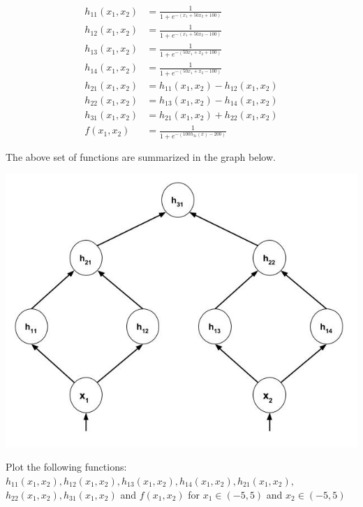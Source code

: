 \documentclass[solution,addpoints,12pt]{exam}
\begin{document}
\begin{questions}
\begin{parts}
                  \begin{align*}
                    h_{11}(x_1, x_2) &= \frac{1}{1 + e^{-(x_1 + 50x_2 + 100)}}  \\
                    h_{12}(x_1, x_2) &= \frac{1}{1 + e^{-(x_1 + 50x_2 - 100)}}  \\
                    h_{13}(x_1, x_2) &= \frac{1}{1 + e^{-(50x_1 + x_2 + 100)}}  \\
                    h_{14}(x_1, x_2) &= \frac{1}{1 + e^{-(50x_1 + x_2 - 100)}}  \\
                    h_{21}(x_1, x_2) &= h_{11}(x_1, x_2) - h_{12}(x_1, x_2)\\
                    h_{22}(x_1, x_2) &= h_{13}(x_1, x_2) - h_{14}(x_1, x_2)\\
                    h_{31}(x_1, x_2) &= h_{21}(x_1, x_2) + h_{22}(x_1, x_2)\\
                    f(x_1, x_2) &= \frac{1}{1 + e^{-(100h_{31}(x) - 200)}}  \\\\
                  \end{align*}
                  The above set of functions are summarized in the graph below.
                    \begin{center}
            		  \includegraphics[scale=0.35]{sig3d}
          		    \end{center} 
                  Plot the following functions: $h_{11}(x_1, x_2), h_{12}(x_1, x_2), h_{13}(x_1, x_2), h_{14}(x_1, x_2), h_{21}(x_1, x_2),$ $h_{22}(x_1, x_2), h_{31}(x_1, x_2)$ and $f(x_1, x_2)$ for $x_1 \in (-5, 5)$ and $x_2 \in (-5, 5)$
            \begin{solution}
            \vspace*{20mm}
            \end{solution}
                 
           \end{parts}
\end{questions}             
\end{document}
